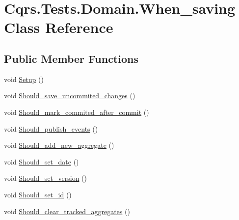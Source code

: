 \hypertarget{classCqrs_1_1Tests_1_1Domain_1_1When__saving}{}\section{Cqrs.\+Tests.\+Domain.\+When\+\_\+saving Class Reference}
\label{classCqrs_1_1Tests_1_1Domain_1_1When__saving}
\subsection*{Public Member Functions}
\begin{DoxyCompactItemize}
\item 
void \hyperlink{classCqrs_1_1Tests_1_1Domain_1_1When__saving_a29fe6aab780ab5acbd6a92924836c839_a29fe6aab780ab5acbd6a92924836c839}{Setup} ()
\item 
void \hyperlink{classCqrs_1_1Tests_1_1Domain_1_1When__saving_a4f0cddba76b9867048c951161d2e1724_a4f0cddba76b9867048c951161d2e1724}{Should\+\_\+save\+\_\+uncommited\+\_\+changes} ()
\item 
void \hyperlink{classCqrs_1_1Tests_1_1Domain_1_1When__saving_ae47fd475f9a374c18835555a94f6bb12_ae47fd475f9a374c18835555a94f6bb12}{Should\+\_\+mark\+\_\+commited\+\_\+after\+\_\+commit} ()
\item 
void \hyperlink{classCqrs_1_1Tests_1_1Domain_1_1When__saving_a9fcc799db9697469f6de5032abde5c4b_a9fcc799db9697469f6de5032abde5c4b}{Should\+\_\+publish\+\_\+events} ()
\item 
void \hyperlink{classCqrs_1_1Tests_1_1Domain_1_1When__saving_a3ee8e1dbc98b99d4dbd1763c460b0528_a3ee8e1dbc98b99d4dbd1763c460b0528}{Should\+\_\+add\+\_\+new\+\_\+aggregate} ()
\item 
void \hyperlink{classCqrs_1_1Tests_1_1Domain_1_1When__saving_a5d00d678982015f0a02358f859a84d8f_a5d00d678982015f0a02358f859a84d8f}{Should\+\_\+set\+\_\+date} ()
\item 
void \hyperlink{classCqrs_1_1Tests_1_1Domain_1_1When__saving_ade8a12bbe6dbe83ad70f3419bd1354a0_ade8a12bbe6dbe83ad70f3419bd1354a0}{Should\+\_\+set\+\_\+version} ()
\item 
void \hyperlink{classCqrs_1_1Tests_1_1Domain_1_1When__saving_a62c2e77bad815f023de1947502593a1f_a62c2e77bad815f023de1947502593a1f}{Should\+\_\+set\+\_\+id} ()
\item 
void \hyperlink{classCqrs_1_1Tests_1_1Domain_1_1When__saving_a7019ce1a593fb978fce8232dab8bece4_a7019ce1a593fb978fce8232dab8bece4}{Should\+\_\+clear\+\_\+tracked\+\_\+aggregates} ()
\end{DoxyCompactItemize}


